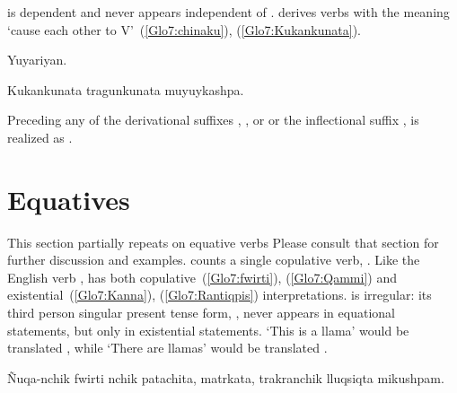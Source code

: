 \noindent
{} is dependent and never appears independent of .  derives verbs with the meaning ‘cause each other to V’~(\ref{Glo7:chinaku}), (\ref{Glo7:Kukankunata}).


%
{Yuyariyan.}%
{}%
{}{}%

%
{Kukankunata tragunkunata muyuykashpa.}%
{}%
{}{}%

Preceding any of the derivational suffixes , , or  or the inflectional suffix ,  is realized as .

\section{Equatives}\label{sec:equative}
This section partially repeats  on equative verbs Please consult that section for further discussion and examples. \SYQ{} counts a single copulative verb, . Like the English verb ,  has both copulative~(\ref{Glo7:fwirti}), (\ref{Glo7:Qammi}) and existential~(\ref{Glo7:Kanna}), (\ref{Glo7:Rantiqpis}) interpretations.  is irregular: its third person singular present tense form, , never appears in equational statements, but only in existential statements. ‘This is a llama’ would be translated  , while ‘There are llamas’ would be translated .


%
{Ñuqa-nchik fwirti nchik patachita, matrkata, trakranchik lluqsiqta mikushpam.}%
{}%
{}{}%

